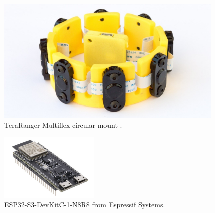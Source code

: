 \begin{figure}[h]
	\centering
	\includegraphics[height=6cm]{assets/terraRangerMultiplex.jpg}
	\caption{TeraRanger Multiflex circular mount \cite{terra_mount}.}
	\label{fig:terraMount}
\end{figure}

\begin{figure}[h]
	\centering
	\includegraphics[height=3.2cm]{assets/ESP32-S3-DEVKITC-1-N8R8.jpg}
	\caption{ESP32-S3-DevKitC-1-N8R8 from Espressif Systems\cite{ESP32-S3-DevKitC-1-Photo-Datasheet}.}
	\label{fig:ESP32-Photo}
\end{figure}
